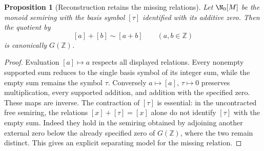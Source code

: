 \documentclass[11pt,a4paper]{article}
\newtheorem{proposition}[theorem]{Proposition}
\theoremstyle{definition}\newtheorem{definition}[theorem]{Definition}
\newcommand{\Z}{\mathbb Z}\newcommand{\Q}{\mathbb Q}
\begin{document}
\begin{proposition}[Reconstruction retains the missing relations]\label{prop:preaddition-rebuild}
Let $\N_0[M]$ be the monoid semiring with the basis symbol $[\tau]$ identified with its additive zero. Then the quotient by
\[
 [a]+[b]\sim[a+b]\qquad(a,b\in\Z)
\]
is canonically $G(\Z)$.
\end{proposition}
\begin{proof}
Evaluation $[a]\mapsto a$ respects all displayed relations. Every nonempty supported sum reduces to the single basis symbol of its integer sum, while the empty sum remains the symbol $\tau$. Conversely $a\mapsto[a]$, $\tau\mapsto0$ preserves multiplication, every supported addition, and addition with the specified zero. These maps are inverse. The contraction of $[\tau]$ is essential: in the uncontracted free semiring, the relations $[x]+[\tau]=[x]$ alone do not identify $[\tau]$ with the empty sum. Indeed they hold in the semiring obtained by adjoining another external zero below the already specified zero of $G(\Z)$, where the two remain distinct. This gives an explicit separating model for the missing relation.
\end{proof}
\end{document}
